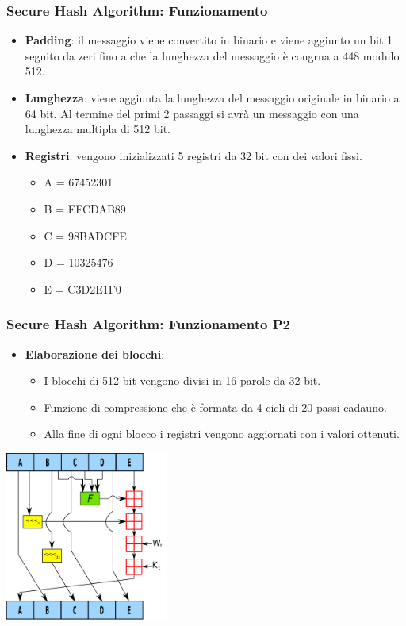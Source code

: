 \begin{frame}
\frametitle{Secure Hash Algorithm: Funzionamento}
\begin{itemize}
    \item \textbf{Padding}: il messaggio viene convertito in binario e viene aggiunto un bit 1 seguito da zeri fino a che la lunghezza del messaggio è congrua a 448 modulo 512.
    \item \textbf{Lunghezza}: viene aggiunta la lunghezza del messaggio originale in binario a 64 bit.
    Al termine del primi 2 passaggi si avrà un messaggio con una lunghezza multipla di 512 bit.
    \item \textbf{Registri}: vengono inizializzati 5 registri da 32 bit con dei valori fissi.
    \begin{itemize}
        \item A = 67452301
        \item B = EFCDAB89
        \item C = 98BADCFE
        \item D = 10325476
        \item E = C3D2E1F0
    \end{itemize}
\end{itemize}
\end{frame}


\begin{frame}
\frametitle{Secure Hash Algorithm: Funzionamento P2}
\begin{itemize}
    \item \textbf{Elaborazione dei blocchi}: 
    \begin{itemize}
        \item I blocchi di 512 bit vengono divisi in 16 parole da 32 bit.
        \item Funzione di compressione che è formata da 4 cicli di 20 passi cadauno.
        \item Alla fine di ogni blocco i registri vengono aggiornati con i valori ottenuti.
    \end{itemize}
\end{itemize}

\begin{center}
    \includegraphics[width=0.4\textwidth]{img/1-img/SHA-1.png}
\end{center}
\end{frame}

